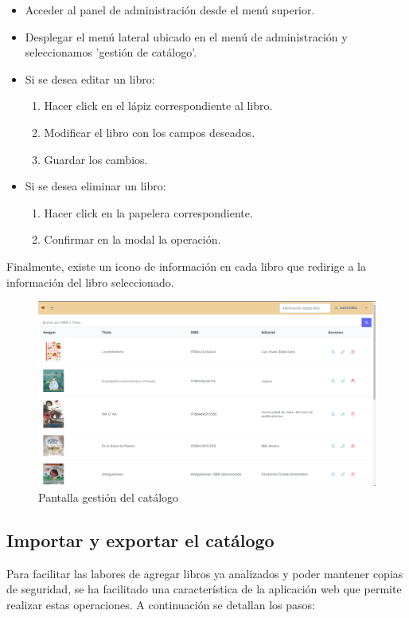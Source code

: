 \begin{itemize}
    \item Acceder al panel de administración desde el menú superior.
    \item Desplegar el menú lateral ubicado en el menú de administración y seleccionamos 'gestión de catálogo'.
    \item Si se desea editar un libro:
    \begin{enumerate}
        \item Hacer click en el lápiz correspondiente al libro.
        \item Modificar el libro con los campos deseados.
        \item Guardar los cambios.
    \end{enumerate}
    \item Si se desea eliminar un libro:
    \begin{enumerate}
        \item Hacer click en la papelera correspondiente.
        \item Confirmar en la modal la operación.
    \end{enumerate}
\end{itemize}

Finalmente, existe un icono de información en cada libro que redirige a la información del libro seleccionado.
\begin{figure}[h]
    \centering
    \includegraphics[width=1\linewidth]{Imagenes/ManualGestionCatalogo.png}
    \caption{Pantalla gestión del catálogo}
    \label{Pantalla gestión del catálogo}
\end{figure}
\FloatBarrier

\subsection{Importar y exportar el catálogo}
Para facilitar las labores de agregar libros ya analizados y poder mantener copias de seguridad, se ha facilitado una característica de la aplicación web que permite realizar estas operaciones. A continuación se detallan los pasos:

